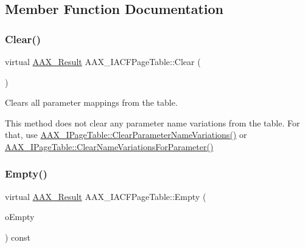 \subsection{Member Function Documentation}
\mbox{\label{a01725_a664fd7f2edd4f258f258541c85cf3a30}} 
\subsubsection{\texorpdfstring{Clear()}{Clear()}}
{\footnotesize\ttfamily virtual \mbox{\hyperlink{a00392_a4d8f69a697df7f70c3a8e9b8ee130d2f}{A\+A\+X\+\_\+\+Result}} A\+A\+X\+\_\+\+I\+A\+C\+F\+Page\+Table\+::\+Clear (\begin{DoxyParamCaption}{ }\end{DoxyParamCaption})\hspace{0.3cm}{\ttfamily [pure virtual]}}



Clears all parameter mappings from the table. 

This method does not clear any parameter name variations from the table. For that, use \mbox{\hyperlink{a01849_a6af3965eaf2baeadef9a44aa9c77ecbb}{A\+A\+X\+\_\+\+I\+Page\+Table\+::\+Clear\+Parameter\+Name\+Variations()}} or \mbox{\hyperlink{a01849_ae6cf05c366d982e8ea92fea1d98f1d22}{A\+A\+X\+\_\+\+I\+Page\+Table\+::\+Clear\+Name\+Variations\+For\+Parameter()}} \mbox{\label{a01725_ac76672810be58fb013c193ba50170f53}} 
\subsubsection{\texorpdfstring{Empty()}{Empty()}}
{\footnotesize\ttfamily virtual \mbox{\hyperlink{a00392_a4d8f69a697df7f70c3a8e9b8ee130d2f}{A\+A\+X\+\_\+\+Result}} A\+A\+X\+\_\+\+I\+A\+C\+F\+Page\+Table\+::\+Empty (\begin{DoxyParamCaption}\item[{\mbox{\hyperlink{a00392_aa216506530f1d19a2965931ced2b274b}{A\+A\+X\+\_\+\+C\+Boolean}} \&}]{o\+Empty }\end{DoxyParamCaption}) const\hspace{0.3cm}{\ttfamily [pure virtual]}}



